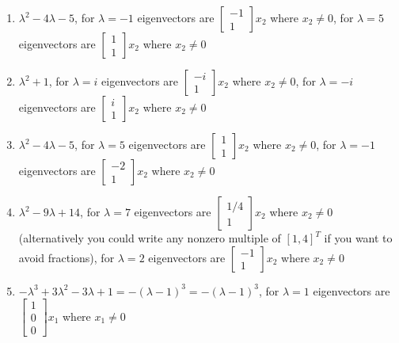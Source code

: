 \begin{multicols}{2}
\begin{enumerate}
\begin{enumerate}
	\item 
$\lambda ^2-4 \lambda -5$,
for 
$\lambda=-1$
eigenvectors are
$\begin{bmatrix}-1\\ 1\end{bmatrix}x_2$ where  $x_2\neq 0$,
for 
$\lambda=5$
eigenvectors are
$\begin{bmatrix}1\\ 1\end{bmatrix}x_2$ where  $x_2\neq 0$


	\item 
$\lambda ^2+1$,
for 
$\lambda=i$
eigenvectors are
$\begin{bmatrix}-i\\ 1\end{bmatrix}x_2$ where  $x_2\neq 0$,
for 
$\lambda=-i$
eigenvectors are
$\begin{bmatrix}i\\ 1\end{bmatrix}x_2$ where  $x_2\neq 0$


	\item 
$\lambda ^2-4 \lambda -5$,
for 
$\lambda=5$
eigenvectors are
$\begin{bmatrix}1\\ 1\end{bmatrix}x_2$ where  $x_2\neq 0$,
for 
$\lambda=-1$
eigenvectors are
$\begin{bmatrix}-2\\ 1\end{bmatrix}x_2$ where  $x_2\neq 0$

	\item 
$\lambda ^2-9 \lambda +14$,
for 
$\lambda=7$
eigenvectors are
$\begin{bmatrix}1/4\\ 1\end{bmatrix}x_2$ where  $x_2\neq 0$ (alternatively you could write any nonzero multiple of $[1,4]^T$ if you want to avoid fractions),
for 
$\lambda=2$
eigenvectors are
$\begin{bmatrix}-1\\ 1\end{bmatrix}x_2$ where  $x_2\neq 0$

	\item 
$-\lambda ^3+3 \lambda ^2-3 \lambda +1 = -(\lambda -1)^3=-(\lambda -1)^3$, 
for 
$\lambda=1$
eigenvectors are
$\begin{bmatrix}1\\ 0\\ 0\end{bmatrix}x_1$ where  $x_1\neq 0$




\end{enumerate}
\end{enumerate}
\end{multicols}
